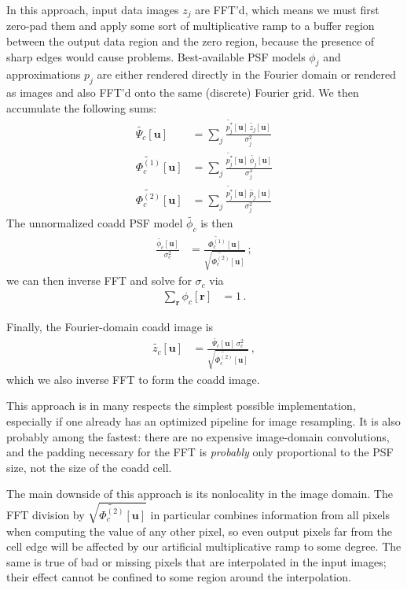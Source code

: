 \documentclass[DM,authoryear,toc]{lsstdoc}
\begin{document}
In this approach, input data images $z_j$ are FFT'd, which means we must first zero-pad them and apply some sort of multiplicative ramp to a buffer region between the output data region and the zero region, because the presence of sharp edges would cause problems.
Best-available PSF models $\phi_j$ and approximations $p_j$ are either rendered directly in the Fourier domain or rendered as images and also FFT'd onto the same (discrete) Fourier grid.
We then accumulate the following sums:
\begin{align}
    \widetilde{\Psi_c}[\symbf{u}] &=
        \sum_j \frac{\widetilde{p_j^*}[\symbf{u}]\,\widetilde{z_j}[\symbf{u}]}{\sigma_j^2} \\
    \widetilde{\Phi_c^{(1)}}[\symbf{u}] &=
        \sum_j \frac{\widetilde{p_j^*}[\symbf{u}]\,\widetilde{\phi_j}[\symbf{u}]}{\sigma_j^2} \\
    \widetilde{\Phi_c^{(2)}}[\symbf{u}] &=
        \sum_j \frac{\widetilde{p_j^*}[\symbf{u}]\,\widetilde{p_j}[\symbf{u}]}{\sigma_j^2}
\end{align}
The unnormalized coadd PSF model $\widetilde{\phi_c}$ is then
\begin{align}
    \frac{\widetilde{\phi_c}[\symbf{u}]}{\sigma_c^2} &= \frac{
        \widetilde{\Phi_c^{(1)}}[\symbf{u}]
    }{
        \sqrt{\widetilde{\Phi_c^{(2)}}[\symbf{u}]}
    } \, ;
\end{align}
we can then inverse FFT and solve for $\sigma_c$ via
\begin{align}
    \sum_{\symbf{r}} \phi_c[\symbf{r}] &= 1 \, .
\end{align}

Finally, the Fourier-domain coadd image is
\begin{align}
    \widetilde{z_c}[\symbf{u}] &= \frac{
        \widetilde{\Psi_c}[\symbf{u}] \, \sigma_c^2
    }{
        \sqrt{\widetilde{\Phi_c^{(2)}}[\symbf{u}]}
    } \, ,
\end{align}
which we also inverse FFT to form the coadd image.

This approach is in many respects the simplest possible implementation, especially if one already has an optimized pipeline for image resampling.
It is also probably among the fastest: there are no expensive image-domain convolutions, and the padding necessary for the FFT is \emph{probably} only proportional to the PSF size, not the size of the coadd cell.

The main downside of this approach is its nonlocality in the image domain.
The FFT division by $\sqrt{\widetilde{\Phi_c^{(2)}}[\symbf{u}]}$ in particular combines information from all pixels when computing the value of any other pixel, so even output pixels far from the cell edge will be affected by our artificial multiplicative ramp to some degree.
The same is true of bad or missing pixels that are interpolated in the input images; their effect cannot be confined to some region around the interpolation.
\end{document}
